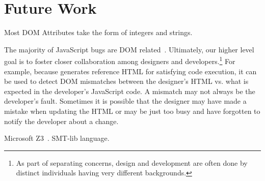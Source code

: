 \section{Future Work}  

Most DOM Attributes take the form of integers and strings.  




The majority of JavaScript bugs are DOM related~\cite{frolin2013}.
Ultimately, our higher level goal is to foster closer collaboration among designers and developers.\footnote{As part of separating concerns, design and development are often done by distinct individuals having very different backgrounds.}
For example, because \tool generates reference HTML for satisfying code execution, it can be used to detect DOM mismatches between the designer's HTML vs. what is expected in the developer's JavaScript code.  
A mismatch may not always be the developer's fault.  Sometimes it is possible that the designer may have made a mistake when updating the HTML or may be just too busy and have forgotten to notify the developer about a change.  



Microsoft Z3~\cite{z3}.  SMT-lib language.






